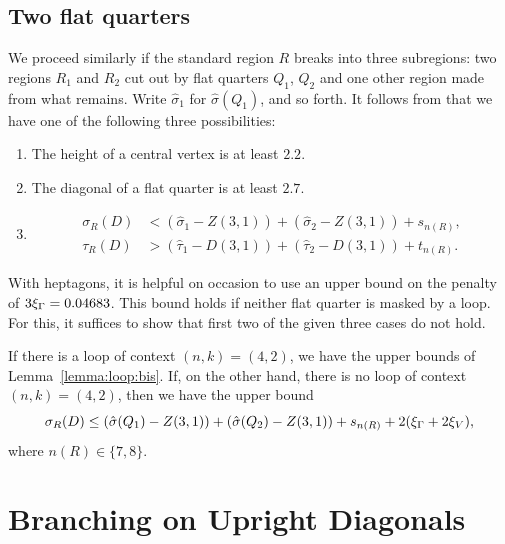 \subsection{Two flat quarters}
We proceed similarly if the standard region $R$ breaks
into three subregions: two regions $R_1$ and $R_2$ cut out by flat
quarters $Q_1$, $Q_2$ and one other region made from what remains.
Write $\hat\sigma_1$ for $\hat\sigma(Q_1)$, and so forth.  It
follows from 
 that we have one of the
following three possibilities:
    \begin{enumerate}
    \item The height of a central vertex is at least $2.2$.
    \item The diagonal of a flat quarter is at least $2.7$.
    \item
        $$
        \begin{array}{lll}
        \sigma_R(D) &< (\hat\sigma_1-Z(3,1)) +
            (\hat\sigma_2-Z(3,1))+ s_{n(R)},\\
        \tau_R(D)
        &>(\hat\tau_1-D(3,1))+(\hat\tau_2-D(3,1))+t_{n(R)}.
        \end{array}
        $$
    \end{enumerate}


With heptagons, it is helpful on occasion to use an upper bound on the
penalty of $3\xi_\Gamma = 0.04683$. This bound holds if neither flat quarter
is masked by a loop. For this, it suffices to show that first two of the
given three cases do not hold.


If there is a loop of context $(n,k)=(4,2)$, we have the upper
bounds of Lemma~\ref{lemma:loop:bis}.  If, on the other hand,
there is no loop of context $(n,k)=(4,2)$, then we have the upper
bound
    $$
    \sigma_R(D)\le
    (\hat\sigma(Q_1)-Z(3,1)) +
    (\hat\sigma(Q_2)-Z(3,1)) + s_{n(R)} + 2(\xi_\Gamma+2\xi_V),
    $$
where $n(R)\in\{7,8\}$.


\section{Branching on Upright Diagonals} %
\label{sec:4.12}

